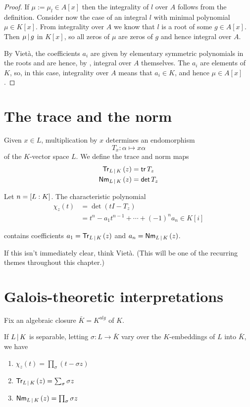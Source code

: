 \begin{proof}
  If $\mu := \mu_l \in A[x]$ then the integrality of $l$ over $A$ follows from the
  definition. Consider now the case of an integral $l$ with minimal polynomial
  $\mu \in K[x]$. From integrality over $A$ we know that $l$ is a root of some
  $g \in A[x]$. Then $\mu \mathop{|} g$ in $K[x]$, so all zeros of $\mu$ are zeros of $g$
  and hence integral over $A$.

  \npar By Viet\`a, the coefficients $a_i$ are given by elementary symmetric
  polynomials in the roots and are hence, by
  , integral over $A$ themselves. The $a_i$
  are elements of $K$, so, in this case, integrality over $A$ means that $a_i
  \in K$, and hence $\mu \in A[x]$.
\end{proof}

\section{The trace and the norm}

Given $x \in L$, multiplication by $x$ determines an endomorphism
\[ T_x : \alpha \mapsto x\alpha \] of the $K$-vector space $L$. We define the
trace and norm maps
\begin{align*}
  {{\mathsf{Tr}}_{L \mathop{|} K}}\left(z\right) &= \operatorname{{\mathsf{tr}}} T_z\\
  {{\mathsf{Nm}}_{L \mathop{|} K}}\left(z\right) &= \operatorname{{\mathsf{det}}} T_z
\end{align*}

Let $n = [L : K]$. The characteristic polynomial
\begin{align*}
  \chi_z(t) &= \det (tI - T_z)\\
            &= t^n - a_1t^{n-1} + \cdots + (-1)^n a_n \in K[i]
\end{align*}

contains coefficients $a_1 = {{\mathsf{Tr}}_{L \mathop{|} K}}\left(z\right)$ and $a_n = {{\mathsf{Nm}}_{L \mathop{|} K}}\left(z\right)$.

\begin{remark}
  If this isn't immediately clear, think Viet\`a. (This will be one of the
  recurring themes throughout this chapter.)
\end{remark}

\section{Galois-theoretic interpretations}

Fix an algebraic closure $\bar{K} = K^{alg}$ of $K$.

\begin{prop}
  If $L \mathop{|} K$ is separable, letting $\sigma : L \to \bar{K}$ vary
  over the $K$-embeddings of $L$ into $\bar{K}$, we have
  \begin{enumerate}
  \item \label{chi-z-product-exp} $\chi_z(t) = \prod_\sigma (t - \sigma z)$
  \item ${{\mathsf{Tr}}_{L \mathop{|} K}}\left(z\right) = \sum_\sigma \sigma z$
  \item ${{\mathsf{Nm}}_{L \mathop{|} K}}\left(z\right) = \prod_\sigma \sigma z$
  \end{enumerate}
\end{prop}

